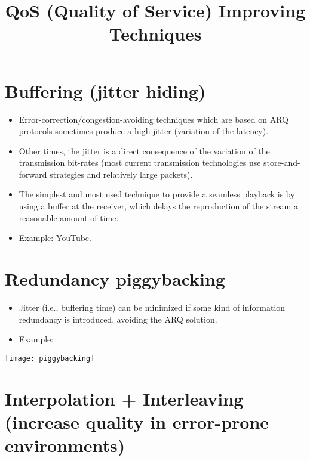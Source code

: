 \title{QoS (Quality of Service) Improving Techniques}

\maketitle
\tableofcontents


\section{Buffering (jitter hiding)}

\begin{itemize}
\item Error-correction/congestion-avoiding techniques which are based
  on ARQ protocols sometimes produce a high jitter (variation of the
  latency).
\item Other times, the jitter is a direct consequence of the variation
  of the transmission bit-rates (most current transmission
  technologies use store-and-forward strategies and relatively large
  packets).
\item The simplest and most used technique to provide a seamless
  playback is by using a buffer at the receiver, which delays the
  reproduction of the stream a reasonable amount of time.
\item Example: YouTube.
\end{itemize}


\section{Redundancy piggybacking}

\begin{itemize}
\item Jitter (i.e., buffering time) can be minimized if some kind of
  information redundancy is introduced, avoiding the ARQ solution.
\item Example:
\end{itemize}
\begin{center}
  \texttt{[image: piggybacking]}
\end{center}


\section{Interpolation + Interleaving (increase quality in error-prone environments)}

